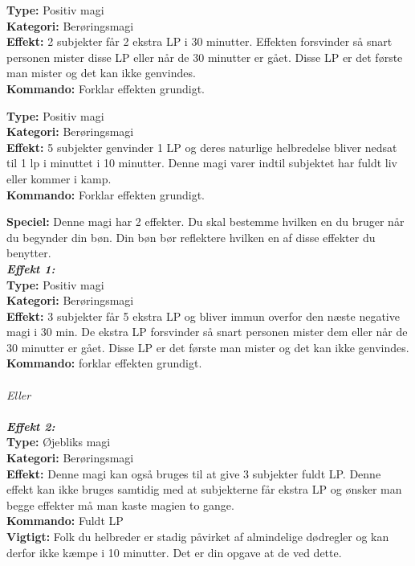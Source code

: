 \begin{nvit*}
\textbf{Type:} Positiv magi\\ 
\textbf{Kategori:} Berøringsmagi\\
\textbf{Effekt:} 2 subjekter får 2 ekstra LP i 30 minutter. Effekten forsvinder så snart personen mister disse LP eller når de 30 minutter er gået. Disse LP er det første man mister og det kan ikke genvindes.\\
\textbf{Kommando:} Forklar effekten grundigt.
\end{nvit*}

\begin{nvit*}
\textbf{Type:} Positiv magi \\
\textbf{Kategori:} Berøringsmagi\\
\textbf{Effekt:} 5 subjekter genvinder 1 LP og deres naturlige helbredelse bliver nedsat til 1 lp i minuttet i 10 minutter. Denne magi varer indtil subjektet har fuldt liv eller kommer i kamp.\\
\textbf{Kommando:} Forklar effekten grundigt.
\end{nvit*}

\begin{nvit*}
\textbf{Speciel:} Denne magi har 2 effekter. Du skal bestemme hvilken en du bruger når du begynder din bøn. Din bøn bør reflektere hvilken en af disse effekter du benytter.\\
\emph{\textit{\textbf{Effekt 1:}}} \\
\textbf{Type:} Positiv magi \\
\textbf{Kategori:} Berøringsmagi\\
\textbf{Effekt:} 3 subjekter får 5 ekstra LP og bliver immun overfor den næste negative magi i 30 min. De ekstra LP forsvinder så snart personen mister dem eller når de 30 minutter er gået. Disse LP er det første man mister og det kan ikke genvindes.\\
\textbf{Kommando:} forklar effekten grundigt.\\
\\
\emph{\textit{Eller}}\\
\\
\emph{\textit{\textbf{Effekt 2:}}}\\
\textbf{Type:} Øjebliks magi \\
\textbf{Kategori:} Berøringsmagi \\
\textbf{Effekt:} Denne magi kan også bruges til at give 3 subjekter fuldt LP. Denne effekt kan ikke bruges samtidig
med at subjekterne får ekstra LP og ønsker man begge effekter må man kaste magien to gange.\\
\textbf{Kommando:} Fuldt LP\\
\textbf{Vigtigt:} Folk du helbreder er stadig påvirket af almindelige dødregler og kan derfor ikke kæmpe i 10 minutter. Det er din opgave at de ved dette.\\
\end{nvit*}

